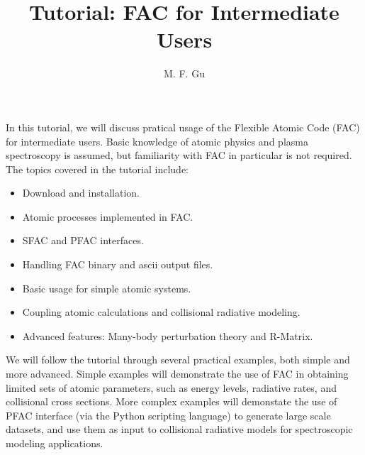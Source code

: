 \documentclass{revtex4}
\begin{document}
\author {M. F. Gu}


\title{Tutorial: FAC for Intermediate Users}

\maketitle

In this tutorial, we will discuss pratical usage of the Flexible Atomic Code (FAC) for intermediate users. Basic knowledge of atomic physics and plasma spectroscopy is assumed, but familiarity with FAC in particular is not required. The topics covered in the tutorial include:

  \begin{itemize}
  \item Download and installation.
  \item Atomic processes implemented in FAC.
  \item SFAC and PFAC interfaces.
  \item Handling FAC binary and ascii output files.
  \item Basic usage for simple atomic systems.
  \item Coupling atomic calculations and collisional radiative modeling.
  \item Advanced features: Many-body perturbation theory and R-Matrix.
  \end{itemize}

  We will follow the tutorial through several practical examples, both simple and more advanced. Simple examples will demonstrate the use of FAC in obtaining limited sets of atomic parameters, such as energy levels, radiative rates, and collisional cross sections. More complex examples will demonstate the use of PFAC interface (via the Python scripting language) to generate large scale datasets, and use them as input to collisional radiative models for spectroscopic modeling applications.
  
\end{document}
